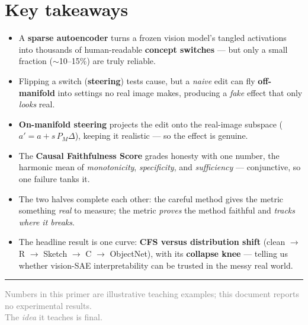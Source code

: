 \documentclass[12pt]{article}
\begin{document}
\section{Key takeaways}

\begin{itemize}[leftmargin=1.4em, itemsep=3pt]
  \item A \textbf{sparse autoencoder} turns a frozen vision model's tangled activations into thousands of human-readable \textbf{concept switches} --- but only a small fraction ($\sim$10--15\%) are truly reliable.
  \item Flipping a switch (\textbf{steering}) tests cause, but a \emph{naive} edit can fly \textbf{off-manifold} into settings no real image makes, producing a \emph{fake} effect that only \emph{looks} real.
  \item \textbf{On-manifold steering} projects the edit onto the real-image subspace ($a' = a + s\,P_M\Delta$), keeping it realistic --- so the effect is genuine.
  \item The \textbf{Causal Faithfulness Score} grades honesty with one number, the harmonic mean of \emph{monotonicity}, \emph{specificity}, and \emph{sufficiency} --- conjunctive, so one failure tanks it.
  \item The two halves complete each other: the careful method gives the metric something \emph{real} to measure; the metric \emph{proves} the method faithful and \emph{tracks where it breaks}.
  \item The headline result is one curve: \textbf{CFS versus distribution shift} (clean $\to$ R $\to$ Sketch $\to$ C $\to$ ObjectNet), with its \textbf{collapse knee} --- telling us whether vision-SAE interpretability can be trusted in the messy real world.
\end{itemize}

\vspace{0.8em}
\hrule
\vspace{0.6em}
\begin{center}
\small\textcolor{graytext}{Numbers in this primer are illustrative teaching examples; this document reports no experimental results. \\ The \emph{idea} it teaches is final.}
\end{center}
\end{document}
